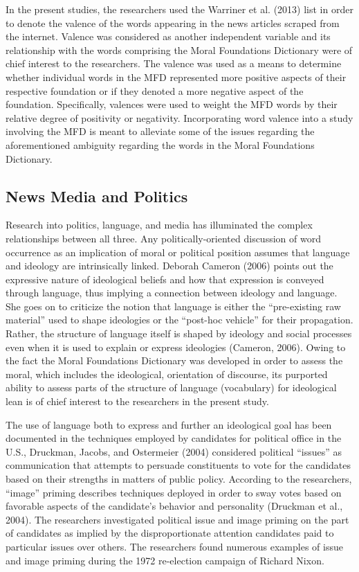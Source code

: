 \documentclass[english,,man]{apa6}
\begin{document}
In the present studies, the researchers used the Warriner et al. (2013) list in order to denote the valence of the words appearing in the news articles scraped from the internet. Valence was considered as another independent variable and its relationship with the words comprising the Moral Foundations Dictionary were of chief interest to the researchers. The valence was used as a means to determine whether individual words in the MFD represented more positive aspects of their respective foundation or if they denoted a more negative aspect of the foundation. Specifically, valences were used to weight the MFD words by their relative degree of positivity or negativity. Incorporating word valence into a study involving the MFD is meant to alleviate some of the issues regarding the aforementioned ambiguity regarding the words in the Moral Foundations Dictionary.

\hypertarget{news-media-and-politics}{%
\subsection{News Media and Politics}\label{news-media-and-politics}}

Research into politics, language, and media has illuminated the complex relationships between all three. Any politically-oriented discussion of word occurrence as an implication of moral or political position assumes that language and ideology are intrinsically linked. Deborah Cameron (2006) points out the expressive nature of ideological beliefs and how that expression is conveyed through language, thus implying a connection between ideology and language. She goes on to criticize the notion that language is either the \enquote{pre-existing raw material} used to shape ideologies or the \enquote{post-hoc vehicle} for their propagation. Rather, the structure of language itself is shaped by ideology and social processes even when it is used to explain or express ideologies (Cameron, 2006). Owing to the fact the Moral Foundations Dictionary was developed in order to assess the moral, which includes the ideological, orientation of discourse, its purported ability to assess parts of the structure of language (vocabulary) for ideological lean is of chief interest to the researchers in the present study.

The use of language both to express and further an ideological goal has been documented in the techniques employed by candidates for political office in the U.S., Druckman, Jacobs, and Ostermeier (2004) considered political \enquote{issues} as communication that attempts to persuade constituents to vote for the candidates based on their strengths in matters of public policy. According to the researchers, \enquote{image} priming describes techniques deployed in order to sway votes based on favorable aspects of the candidate's behavior and personality (Druckman et al., 2004). The researchers investigated political issue and image priming on the part of candidates as implied by the disproportionate attention candidates paid to particular issues over others. The researchers found numerous examples of issue and image priming during the 1972 re-election campaign of Richard Nixon.
\end{document}
